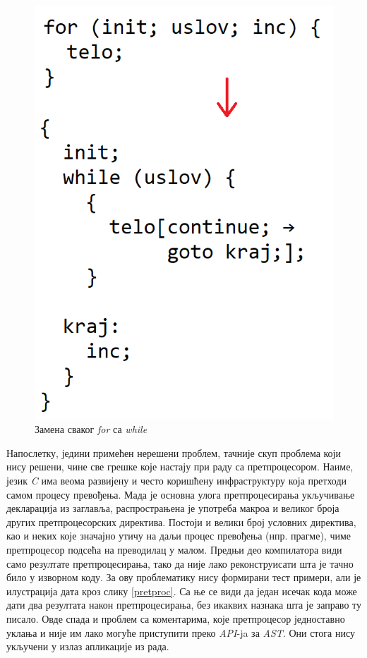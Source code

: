 \documentclass[a4paper]{article}
\begin{document}
\begin{figure}[h!]
\begin{center}
\includegraphics[scale=0.6]{for2while2}
\end{center}
\caption{Замена сваког \textit{for} са \textit{while}}
\label{for2while2}
\end{figure}

Напослетку, једини примећен нерешени проблем, тачније скуп проблема који нису решени, чине све грешке које настају при раду са претпроцесором. Наиме, језик \textit{C} има веома развијену и често коришћену инфраструктуру која претходи самом процесу превођења. Мада је основна улога претпроцесирања укључивање декларација из заглавља, распрострањена је употреба макроа и великог броја других претпроцесорских директива. Постоји и велики број условних директива, као и неких које значајно утичу на даљи процес превођења (нпр. прагме), чиме претпроцесор подсећа на преводилац у малом. Предњи део компилатора види само резултате претпроцесирања, тако да није лако реконструисати шта је тачно било у изворном коду. За ову проблематику нису формирани тест примери, али је илустрација дата кроз слику \ref{pretproc}. Са ње се види да један исечак кода може дати два резултата након претпроцесирања, без икаквих назнака шта је заправо ту писало. Овде спада и проблем са коментарима, које претпроцесор једноставно уклања и није им лако могуће приступити преко \textit{API}-ja за \textit{AST}. Они стога нису укључени у излаз апликације из рада.
\end{document}
